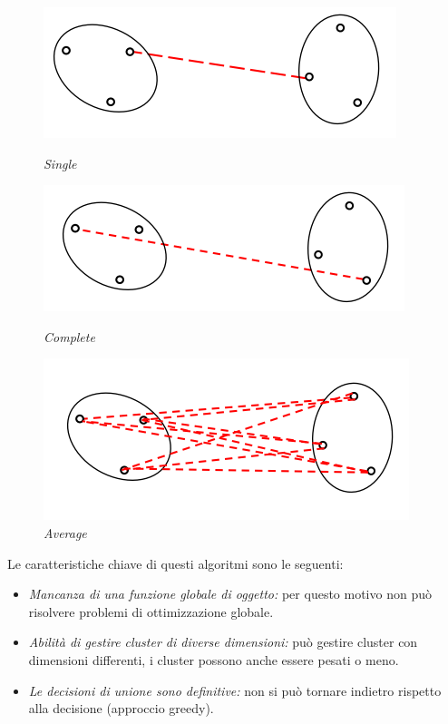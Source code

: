 	\begin{figure}[H]
	\begin{minipage}[b]{0.30\textwidth}
		\centering
		\includegraphics[width=\textwidth]{clustering/pict/sing_linkage.png}
		\caption{ \textit{Single}}
	\end{minipage}
	\hfill
	\begin{minipage}[b]{0.30\textwidth}
		\centering
		\includegraphics[width=\textwidth]{clustering/pict/complete_linkage.png}
		\caption{\textit{Complete}}
	\end{minipage}
	\begin{minipage}[b]{0.30\textwidth}
	\centering
	\includegraphics[width=\textwidth]{clustering/pict/average_linkage.png}
	\caption{\textit{Average}}
\end{minipage}
\end{figure}

Le caratteristiche chiave di questi algoritmi sono le seguenti:
\begin{itemize}
	\item \textit{Mancanza di una funzione globale di oggetto:} per questo motivo non può risolvere problemi di ottimizzazione globale.
	\item \textit{Abilità di gestire cluster di diverse dimensioni:} può gestire cluster con dimensioni differenti, i cluster possono anche essere pesati o meno.
	\item \textit{Le decisioni di unione sono definitive:} non si può tornare indietro rispetto alla decisione (approccio greedy).
\end{itemize}

